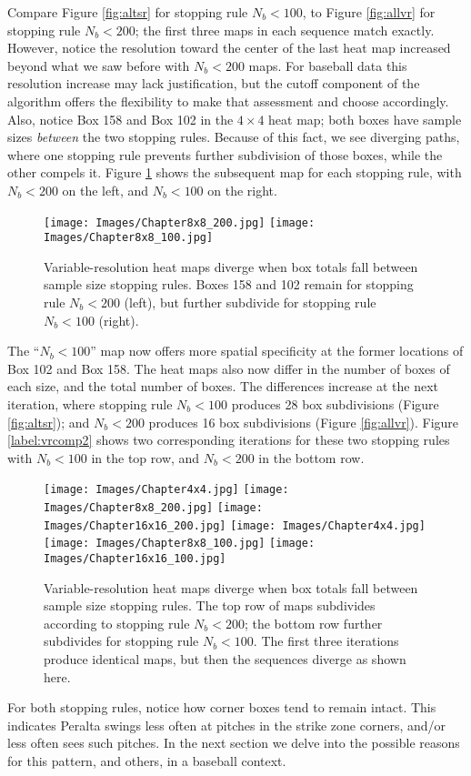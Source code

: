 Compare Figure \ref{fig:altsr} for stopping rule $N_{b} < 100$, to Figure \ref{fig:allvr} for stopping rule $N_{b} < 200$; the first three maps in each sequence match exactly. However, notice the resolution toward the center of the last heat map increased beyond what we saw before with $N_{b} < 200$ maps. For baseball data this resolution increase may lack justification, but the cutoff component of the algorithm offers the flexibility to make that assessment and choose accordingly. Also, notice Box 158 and Box 102 in the $4 \times 4$ heat map; both boxes have sample sizes {\it between} the two stopping rules. Because of this fact, we see diverging paths, where one stopping rule prevents further subdivision of those boxes, while the other compels it. Figure \ref{fig:vrcomp} shows the subsequent map for each stopping rule, with $N_{b} < 200$ on the left, and $N_{b} < 100$ on the right.
        \begin{figure}[H]
      	\centering      
      	\texttt{[image: Images/Chapter8x8\_200.jpg]}
      	\texttt{[image: Images/Chapter8x8\_100.jpg]}
      	\caption{Variable-resolution heat maps diverge when box totals fall between sample size stopping rules. Boxes 158 and 102 remain for stopping rule $N_{b} < 200$ (left), but further subdivide for stopping rule $N_{b} < 100$ (right).}
      	\label{fig:vrcomp}
\end{figure} 
The ``$N_{b} < 100$'' map now offers more spatial specificity at the former locations of Box 102 and Box 158. The heat maps also now differ in the number of boxes of each size, and the total number of boxes.  The differences increase at the next iteration, where stopping rule $N_{b} < 100$ produces 28 box subdivisions (Figure \ref{fig:altsr}); and $N_{b} < 200$ produces 16 box subdivisions (Figure \ref{fig:allvr}). Figure \ref{label:vrcomp2} shows two corresponding iterations for these two stopping rules with $N_{b} < 100$ in the top row, and $N_{b} < 200$ in the bottom row.
        \begin{figure}[H]
      	\centering      
      	\texttt{[image: Images/Chapter4x4.jpg]}
      	\texttt{[image: Images/Chapter8x8\_200.jpg]}
      	\texttt{[image: Images/Chapter16x16\_200.jpg]}
      	\texttt{[image: Images/Chapter4x4.jpg]}
      	\texttt{[image: Images/Chapter8x8\_100.jpg]}
      	\texttt{[image: Images/Chapter16x16\_100.jpg]}
      	\caption{Variable-resolution heat maps diverge when box totals fall between sample size stopping rules. The top row of maps subdivides according to stopping rule $N_{b} < 200$; the bottom row further subdivides for stopping rule $N_{b} < 100$. The first three iterations produce identical maps, but then the sequences diverge as shown here.}
      	\label{fig:vrcomp2}
\end{figure}
For both stopping rules, notice how corner boxes tend to remain intact. This indicates Peralta swings less often at pitches in the strike zone corners, and/or less often sees such pitches. In the next section we delve into the possible reasons for this pattern, and others, in a baseball context.

